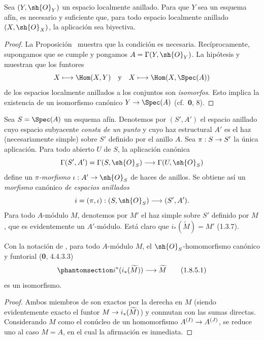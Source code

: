 \documentclass[oneside,10pt]{amsart}
\makeatletter
\newcommand{\ega@arrow}[2]{\mathchoice{#1}{#2}{#2}{#2}}
\renewcommand{\to}{\ega@arrow{\longrightarrow}{\rightarrow}}
\let\EGAOriginalLabel\label
\renewcommand{\label}[1]{\phantomsection\EGAOriginalLabel{#1}}
\makeatother
\begin{document}
\begin{corollary}[1.8.3]
\label{ega2:addendum:I.1.8.3}
Sea $(Y,\sh{O}_Y)$ un espacio localmente anillado. Para que $Y$ sea un
esquema afín, es necesario y suficiente que, para todo espacio
localmente anillado $(X,\sh{O}_X)$, la aplicación  sea
biyectiva.
\end{corollary}

\begin{proof}
La Proposición~ muestra que la condición es necesaria.
Recíprocamente, supongamos que se cumple y pongamos
$A=\Gamma(Y,\sh{O}_Y)$. La hipótesis y  muestran que los
funtores
\[
  X\longmapsto\Hom(X,Y)
  \quad\hbox{y}\quad
  X\longmapsto\Hom(X,\Spec(A))
\]
de los espacios localmente anillados a los conjuntos son \emph{isomorfos}.
Esto implica la existencia de un isomorfismo canónico
$Y\to\Spec(A)$ (cf.~\textbf 0, 8).
\end{proof}

\begin{env}[1.8.4]
\label{ega2:addendum:I.1.8.4}
Sea $S=\Spec(A)$ un esquema afín. Denotemos por $(S',A')$ el espacio
anillado cuyo espacio subyacente \emph{consta de un punto} y cuyo haz
estructural $A'$ es el haz (necesariamente simple) sobre $S'$ definido
por el anillo $A$. Sea $\pi:S\to S'$ la única aplicación. Para todo
abierto $U$ de $S$, la aplicación canónica
\[
  \Gamma(S',A')=\Gamma(S,\sh{O}_S)\to\Gamma(U,\sh{O}_S)
\]
define un \emph{$\pi$-morfismo} $\iota:A'\to\sh{O}_S$ de haces de anillos.
Se obtiene así un \emph{morfismo} canónico \emph{de espacios anillados}
\[
  i=(\pi,\iota):(S,\sh{O}_S)\to(S',A').
\]
Para todo $A$-módulo $M$, denotemos por $M'$ el haz simple sobre $S'$
definido por $M$, que es evidentemente un $A'$-módulo. Está claro que
$i_*(\widetilde M)=M'$ (1.3.7).
\end{env}

\begin{lemma}[1.8.5]
\label{ega2:addendum:I.1.8.5}
Con la notación de , para todo $A$-módulo $M$, el
$\sh{O}_S$-homomorfismo canónico y funtorial \textup{(\textbf{0}, 4.4.3.3)}
\begin{equation}
\label{ega2:addendum:I.1.8.5.1}
  i^*(i_*(\widetilde M))\to\widetilde M
\tag{1.8.5.1}
\end{equation}
es un isomorfismo.
\end{lemma}

\begin{proof}
Ambos miembros de  son exactos por la derecha en $M$
(siendo evidentemente exacto el funtor
$M\to i_*(\widetilde M)$) y conmutan con las sumas directas.
Considerando $M$ como el conúcleo de un homomorfismo
$A^{(I)}\to A^{(J)}$, se reduce uno al caso $M=A$, en el cual la
afirmación es inmediata.
\end{proof}
\end{document}
